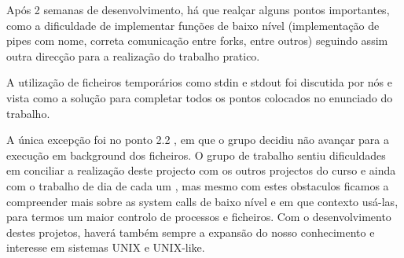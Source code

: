 \documentclass[11pt,a4paper]{report}
\begin{document}
Após 2 semanas de desenvolvimento, há que realçar alguns pontos importantes, como a dificuldade de implementar funções de baixo nível (implementação de pipes com nome, correta comunicação entre forks, entre outros) seguindo assim outra direcção para a realização do trabalho pratico.            

A utilização de ficheiros temporários como stdin e stdout foi discutida por nós e vista como a solução para completar todos os pontos colocados no enunciado do trabalho.

A única excepção foi no ponto 2.2 , em que o grupo decidiu não avançar para a execução em background dos ficheiros.                
O grupo de trabalho sentiu dificuldades em conciliar a realização deste projecto com os outros projectos do curso e ainda com o trabalho de dia de cada um , mas mesmo com estes obstaculos ficamos a compreender mais sobre as system calls de baixo nível e em que contexto usá-las, para termos um maior controlo de processos e ficheiros. 
Com o desenvolvimento destes projetos, haverá também sempre a expansão do nosso conhecimento e interesse em sistemas UNIX e UNIX-like.
\end{document}
